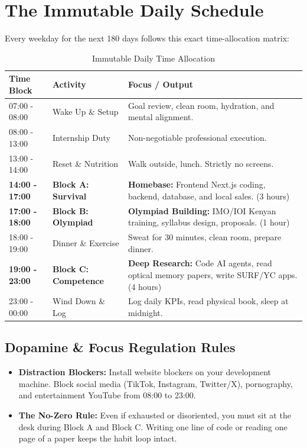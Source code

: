 \documentclass[11pt,a4paper]{article}
\begin{document}
\section{The Immutable Daily Schedule}
Every weekday for the next 180 days follows this exact time-allocation matrix:
\begin{table}[h]
\centering
\begin{tabularx}{\textwidth}{l|l|X}
\toprule
\textbf{Time Block} & \textbf{Activity} & \textbf{Focus / Output} \\
\midrule
07:00 - 08:00 & Wake Up \& Setup & Goal review, clean room, hydration, and mental alignment. \\
08:00 - 13:00 & Internship Duty & Non-negotiable professional execution. \\
13:00 - 14:00 & Reset \& Nutrition & Walk outside, lunch. Strictly no screens. \\
\textbf{14:00 - 17:00} & \textbf{Block A: Survival} & \textbf{Homebase:} Frontend Next.js coding, backend, database, and local sales. (3 hours) \\
\textbf{17:00 - 18:00} & \textbf{Block B: Olympiad} & \textbf{Olympiad Building:} IMO/IOI Kenyan training, syllabus design, proposals. (1 hour) \\
18:00 - 19:00 & Dinner \& Exercise & Sweat for 30 minutes, clean room, prepare dinner. \\
\textbf{19:00 - 23:00} & \textbf{Block C: Competence} & \textbf{Deep Research:} Code AI agents, read optical memory papers, write SURF/YC apps. (4 hours) \\
23:00 - 00:00 & Wind Down \& Log & Log daily KPIs, read physical book, sleep at midnight. \\
\bottomrule
\end{tabularx}
\caption{Immutable Daily Time Allocation}
\end{table}

\subsection{Dopamine \& Focus Regulation Rules}
\begin{itemize}
    \item \textbf{Distraction Blockers:} Install website blockers on your development machine. Block social media (TikTok, Instagram, Twitter/X), pornography, and entertainment YouTube from 08:00 to 23:00.
    \item \textbf{The No-Zero Rule:} Even if exhausted or disoriented, you must sit at the desk during Block A and Block C. Writing one line of code or reading one page of a paper keeps the habit loop intact.
\end{itemize}
\end{document}
